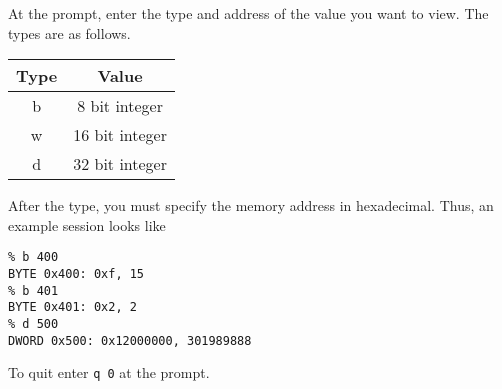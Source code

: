 \documentclass[12pt,letterpaper,titlepage,twoside]{book}
\begin{document}
At the prompt, enter the type and address of the value you want to view. The types are as follows.

\begin{tabular}{|c|c|}
\hline  \textbf{Type} & \textbf{Value} \\ 
\hline  b & 8 bit integer \\ 
\hline  w & 16 bit integer \\
\hline  d & 32 bit integer \\
\hline 
\end{tabular} 

After the type, you must specify the memory address in hexadecimal. Thus, an example session looks like

\begin{verbatim}
% b 400
BYTE 0x400: 0xf, 15
% b 401
BYTE 0x401: 0x2, 2
% d 500
DWORD 0x500: 0x12000000, 301989888
\end{verbatim}

To quit enter \verb|q 0| at the prompt.
\end{document}
